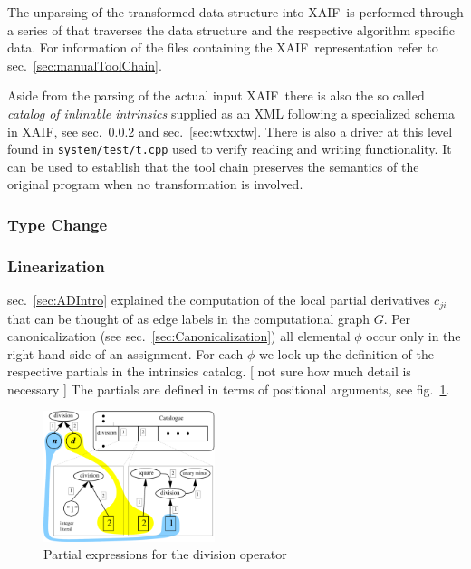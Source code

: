 \documentclass{book}
\newcommand{\xaif}{XAIF}
\newcommand{\refsec}[1]{{sec.~\ref{#1}}}
\newcommand{\reffig}[1]{{fig.~\ref{#1}}}
\begin{document}
The unparsing of the transformed data structure into \xaif\ is performed 
through a series of that traverses the data structure and the 
respective algorithm specific data. 
For information of the files containing the \xaif\ representation refer to 
\refsec{sec:manualToolChain}.

Aside from the parsing of the actual input \xaif\ there is also the so called 
{\em 
  catalog of inlinable intrinsics
} 
supplied as an XML following a specialized schema in \xaif, see  
\refsec{sec:linearization} and \refsec{sec:wtxxtw}.
There is also a driver at this level found in \lstinline{system/test/t.cpp} used 
to verify reading and writing functionality. It can be used to establish 
that the tool chain preserves the semantics of the original program when 
no transformation is involved. 

\subsubsection{Type Change}\label{sec:typechange}

\subsubsection{Linearization}\label{sec:linearization}

\refsec{sec:ADIntro} explained the computation of 
the local partial derivatives $c_{ji}$ that can be thought of as edge labels 
in the computational graph $G$. 
Per canonicalization (see \refsec{sec:Canonicalization}) 
all elemental $\phi$ 
occur only in the right-hand side of an assignment. 
For each $\phi$ we look up the definition of the respective partials in 
the intrinsics catalog. 
{\color{red} [ not sure  how much detail is necessary ] } 
The partials are defined in terms of positional arguments, see 
\reffig{fig:divExample}. 
\begin{figure}
  \centering \includegraphics[width=5cm]{divIntrinsic}
  \caption{Partial expressions for the division operator} \label{fig:divExample}
\end{figure}
\end{document}
